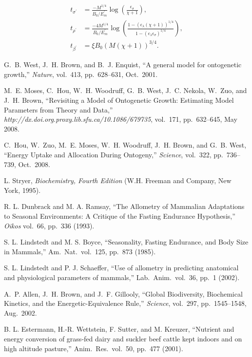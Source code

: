 \documentclass[twocolumn,preprintnumbers,amsmath,amssymb,superscriptaddress]{revtex4}
\begin{document}
\begin{align}
t_{\sigma^\prime} &= \frac{-M^{1/4}}{B_0/E_m^\prime}\log \left(\frac{\epsilon_\sigma}{\chi +1}\right), \\ \nonumber
t_{\rho^\prime} &= \frac{-4 M^{1/4} }{B_0/E_m^\prime}\log \left(\frac{1-( \epsilon_\lambda(\chi +1))^{1/4}}{1-(\epsilon_\lambda \epsilon_\sigma)^{1/4}}\right), \\ \nonumber
t_{\beta^\prime} &= \xi B_0\left(M(\chi + 1)\right)^{3/4}.
\end{align}


\begin{thebibliography}{9}

 G.~B. West, J.~H. Brown, and B.~J. Enquist, ``{A
    general model for ontogenetic growth},'' {\em Nature}, vol.~413,
  pp.~628--631, Oct.\ 2001.

 M.~E. Moses, C.~Hou, W.~H. Woodruff, G.~B. West,
  J.~C. Nekola, W.~Zuo, and J.~H. Brown, ``{Revisiting a Model of Ontogenetic
    Growth: Estimating Model Parameters from Theory and Data},'' {\em
    http://dx.doi.org.proxy.lib.sfu.ca/10.1086/679735}, vol.~171,
  pp.~632--645, May 2008.


 C.~Hou, W.~Zuo, M.~E. Moses, W.~H. Woodruff, J.~H. Brown, and
  G.~B. West, ``{Energy Uptake and Allocation During Ontogeny},'' {\em
    Science}, vol.~322, pp.~736--739, Oct.\ 2008.

 L. Stryer, \emph{Biochemistry, Fourth Edition} (W.H. Freeman and
  Company, New York, 1995).

 R. L. Dunbrack and M. A. Ramsay, ``The Allometry of
  Mammalian Adaptations to Seasonal Environments: A Critique of the Fasting
  Endurance Hypothesis,'' \emph{Oikos} vol.~66, pp.~336 (1993).

 S. L. Lindstedt and M. S. Boyce, ``Seasonality,
  Fasting Endurance, and Body Size in Mammals,'' Am.\ Nat.\ vol.~125, pp.~873
  (1985).

 S. L. Lindstedt and P. J. Schaeffer, ``Use of
  allometry in predicting anatomical and physiological parameters of
  mammals,'' Lab.\ Anim.\ vol.~36, pp.~1 (2002).

 A.~P. Allen, J.~H. Brown, and J.~F. Gillooly, ``{Global
    Biodiversity, Biochemical Kinetics, and the Energetic-Equivalence
    Rule},'' {\em Science}, vol.~297, pp.~1545--1548, Aug.\ 2002.
 
 B. L. Estermann, H.-R. Wettstein, F. Sutter, and
  M. Kreuzer, ``Nutrient and energy conversion of grass-fed dairy and suckler
  beef cattle kept indoors and on high altitude pasture,'' Anim.\ Res.\ vol.~50,
  pp.~477 (2001).  

\end{thebibliography}
\end{document}

